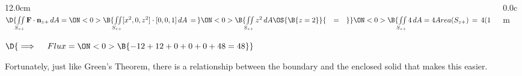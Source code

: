 \begin{frame}
\begin{columns}
\begin{column}{12.0cm}
$\D{\iint \limits_{S_{z+}} {\bf F} \cdot {\bf n}_{z+}\, dA = 
\ON<0>{\B{\iint \limits_{S_{z+}} [x^2,0,z^2] \cdot [0,0,1]\, dA \,=\, }}
\ON<0>{\B{\iint \limits_{S_{z+}} z^2 \, dA \OS{\B{z=2}}{\quad=\quad} }}
\ON<0>{\B{\iint \limits_{S_{z+}} 4 \, dA = 4Area(S_{z+}) \,=\, 4(12) = 48}}}$
	
\vspace{0.3cm}

\begin{center}
	$\D{\implies \quad Flux = \ON<0>{\B{-12+12+0+0+0+48 = 48}}}$
\end{center}

Fortunately, just like Green's Theorem, there is a relationship between the boundary and the enclosed solid that makes this easier.
	
\end{column}\begin{column}{0.0cm}\end{column}\end{columns}
\end{frame}


%
%
%	
%	
%
%
%


